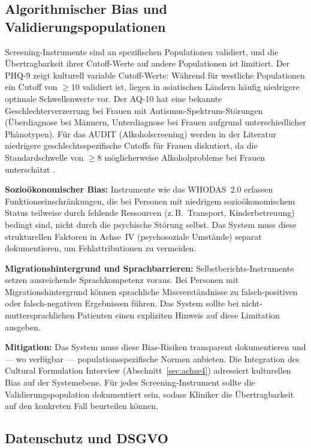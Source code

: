 \documentclass[11pt,a4paper]{article}
\begin{document}
\subsection{Algorithmischer Bias und Validierungspopulationen}

Screening-Instrumente sind an spezifischen Populationen validiert, und die \"Ubertragbarkeit ihrer Cutoff-Werte auf andere Populationen ist limitiert. Der PHQ-9 zeigt kulturell variable Cutoff-Werte: W\"ahrend f\"ur westliche Populationen ein Cutoff von $\geq 10$ validiert ist, liegen in asiatischen L\"andern h\"aufig niedrigere optimale Schwellenwerte vor. Der AQ-10 hat eine bekannte Geschlechterverzerrung bei Frauen mit Autismus-Spektrum-St\"orungen (\"Uberdiagnose bei M\"annern, Unterdiagnose bei Frauen aufgrund unterschiedlicher Ph\"anotypen). F\"ur das AUDIT (Alkoholscreening) werden in der Literatur niedrigere geschlechtsspezifische Cutoffs f\"ur Frauen diskutiert, da die Standardschwelle von $\geq 8$ m\"oglicherweise Alkoholprobleme bei Frauen untersch\"atzt \citep{Saunders1993}.

\textbf{Sozio\"okonomischer Bias:} Instrumente wie das WHODAS~2.0 erfassen Funktionseinschr\"ankungen, die bei Personen mit niedrigem sozio\"okonomischem Status teilweise durch fehlende Ressourcen (z.\,B.\ Transport, Kinderbetreuung) bedingt sind, nicht durch die psychische St\"orung selbst. Das System muss diese strukturellen Faktoren in Achse~IV (psychosoziale Umst\"ande) separat dokumentieren, um Fehlattributionen zu vermeiden.

\textbf{Migrationshintergrund und Sprachbarrieren:} Selbstberichts-Instrumente setzen ausreichende Sprachkompetenz voraus. Bei Personen mit Migrationshintergrund k\"onnen sprachliche Missverst\"andnisse zu falsch-positiven oder falsch-negativen Ergebnissen f\"uhren. Das System sollte bei nicht-muttersprachlichen Patienten einen expliziten Hinweis auf diese Limitation ausgeben.

\textbf{Mitigation:} Das System muss diese Bias-Risiken transparent dokumentieren und --- wo verf\"ugbar --- populationsspezifische Normen anbieten. Die Integration des Cultural Formulation Interview (Abschnitt~\ref{sec:achse4}) adressiert kulturellen Bias auf der Systemebene. F\"ur jedes Screening-Instrument sollte die Validierungspopulation dokumentiert sein, sodass Kliniker die \"Ubertragbarkeit auf den konkreten Fall beurteilen k\"onnen.

\subsection{Datenschutz und DSGVO}
\end{document}
